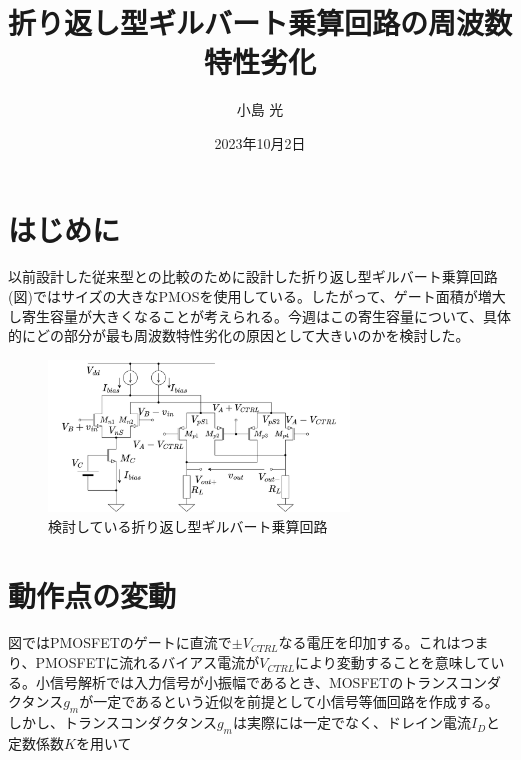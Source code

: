 \documentclass[twocolumn]{jsarticle}
\begin{document}
\title{折り返し型ギルバート乗算回路の周波数特性劣化}
\author{小島 光}
\date{2023年10月2日}
\maketitle

\section{はじめに}
以前設計した従来型との比較のために設計した折り返し型ギルバート乗算回路(図)ではサイズの大きなPMOSを使用している。したがって、ゲート面積が増大し寄生容量が大きくなることが考えられる。今週はこの寄生容量について、具体的にどの部分が最も周波数特性劣化の原因として大きいのかを検討した。

\begin{figure}[h]
    \begin{center}
        \includegraphics*[width=80mm]{figures/folded_gilbert.png}
        \caption{検討している折り返し型ギルバート乗算回路}
        \label{fig:folded_gilbert}
    \end{center}
\end{figure}

\section{動作点の変動}

図ではPMOSFETのゲートに直流で$\pm V_{CTRL}$なる電圧を印加する。これはつまり、PMOSFETに流れるバイアス電流が$V_{CTRL}$により変動することを意味している。小信号解析では入力信号が小振幅であるとき、MOSFETのトランスコンダクタンス$g_{m}$が一定であるという近似を前提として小信号等価回路を作成する。しかし、トランスコンダクタンス$g_{m}$は実際には一定でなく、ドレイン電流$I_{D}$と定数係数$K$を用いて
\end{document}
